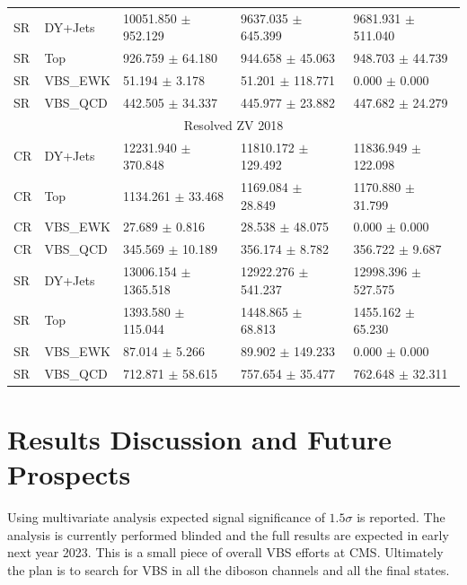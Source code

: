 \begin{table}
{\begin{tabular}{lllll}
      SR     & DY+Jets  & 10051.850 \( \pm \) 952.129  & 9637.035 \( \pm \) 645.399  & 9681.931 \( \pm \) 511.040  \\
      SR     & Top      & 926.759 \( \pm \) 64.180     & 944.658 \( \pm \) 45.063    & 948.703 \( \pm \) 44.739    \\
      SR     & VBS\_EWK & 51.194 \( \pm \) 3.178       & 51.201 \( \pm \) 118.771    & 0.000 \( \pm \) 0.000       \\
      SR     & VBS\_QCD & 442.505 \( \pm \) 34.337     & 445.977 \( \pm \) 23.882    & 447.682 \( \pm \) 24.279    \\
      \midrule
      \multicolumn{5}{c}{Resolved ZV 2018}                                                                         \\
      \midrule
      CR     & DY+Jets  & 12231.940 \( \pm \) 370.848  & 11810.172 \( \pm \) 129.492 & 11836.949 \( \pm \) 122.098 \\
      CR     & Top      & 1134.261 \( \pm \) 33.468    & 1169.084 \( \pm \) 28.849   & 1170.880 \( \pm \) 31.799   \\
      CR     & VBS\_EWK & 27.689 \( \pm \) 0.816       & 28.538 \( \pm \) 48.075     & 0.000 \( \pm \) 0.000       \\
      CR     & VBS\_QCD & 345.569 \( \pm \) 10.189     & 356.174 \( \pm \) 8.782     & 356.722 \( \pm \) 9.687     \\
      SR     & DY+Jets  & 13006.154 \( \pm \) 1365.518 & 12922.276 \( \pm \) 541.237 & 12998.396 \( \pm \) 527.575 \\
      SR     & Top      & 1393.580 \( \pm \) 115.044   & 1448.865 \( \pm \) 68.813   & 1455.162 \( \pm \) 65.230   \\
      SR     & VBS\_EWK & 87.014 \( \pm \) 5.266       & 89.902 \( \pm \) 149.233    & 0.000 \( \pm \) 0.000       \\
      SR     & VBS\_QCD & 712.871 \( \pm \) 58.615     & 757.654 \( \pm \) 35.477    & 762.648 \( \pm \) 32.311    \\
      \bottomrule
    \end{tabular}}\label{tab:fit-values-zjj}
\end{table}

\section{
  Results Discussion and Future Prospects
 }

Using multivariate analysis expected signal significance
of \(1.5 \sigma \) is reported. The analysis is
currently performed blinded and the full results
are expected in early next year 2023. This is
a small piece of overall \gls{VBS} efforts at \gls{CMS}. Ultimately
the plan is to search for \gls{VBS} in all the diboson
channels and all the final states.


